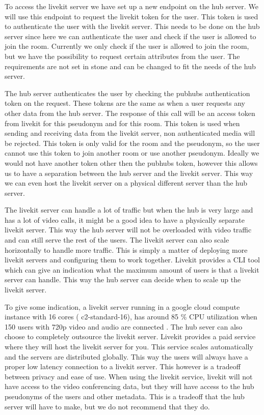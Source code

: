 \documentclass{report}
\begin{document}
To access the livekit server we have set up a new endpoint on the hub server. We will use this endpoint to request
the livekit token for the user. This token is used to authenticate the user with the livekit server. This needs to
be done on the hub server since here we can authenticate the user and check if the user is allowed to join the room.
Currently we only check if the user is allowed to join the room, but we have the possibility to request certain
attributes from the user. The requirements are not set in stone and can be changed to fit the needs of the hub server.

The hub server authenticates the user by checking the pubhubs authentication token on the request. These tokens are
the same as when a user requests any other data from the hub server. The response of this call will be an
access token from livekit for this pseudonym and for this room. This token is used when sending and receiving data
from the livekit server, non authenticated media will be rejected. This token is only valid for the room and the
pseudonym, so the user cannot use this token to join another room or use another pseudonym. Ideally we would not
have another token other then the pubhubs token, however this allows us to have a separation between the hub server
and the livekit server. This way we can even host the livekit server on a physical different server than the hub server.

The livekit server can handle a lot of traffic but when the hub is very large and has a lot of video calls, it
might be a good idea to have a physically separate livekit server. This way the hub server will not be overloaded with
video traffic and can still serve the rest of the users. The livekit server can also scale horizontally to handle
more traffic. This is simply a matter of deploying more livekit servers and configuring them to work together.
Livekit provides a CLI tool which can give an indication what the maximum amount of users is that a livekit server
can handle. This way the hub server can decide when to scale up the livekit server.

To give some indication, a livekit server running in a google cloud compute instance with 16 cores (
c2-standard-16), has around 85 \% CPU utilization when 150 users with 720p video and audio are connected
\cite{noauthor_benchmarking_nodate}. The hub sever can also choose to completely outsource the livekit server.
Livekit provides a paid service where they will host the livekit server for you. This service scales
automatically and the servers are distributed globally. This way the users will always have a proper low
latency connection to a livekit server. This however is a tradeoff between privacy and ease of use. When using
the livekit service, livekit will not have access to the video conferencing data, but they will have access to
the hub pseudonyms of the users and other metadata. This is a tradeoff that the hub server will have to make,
but we do not recommend that they do.
\end{document}
